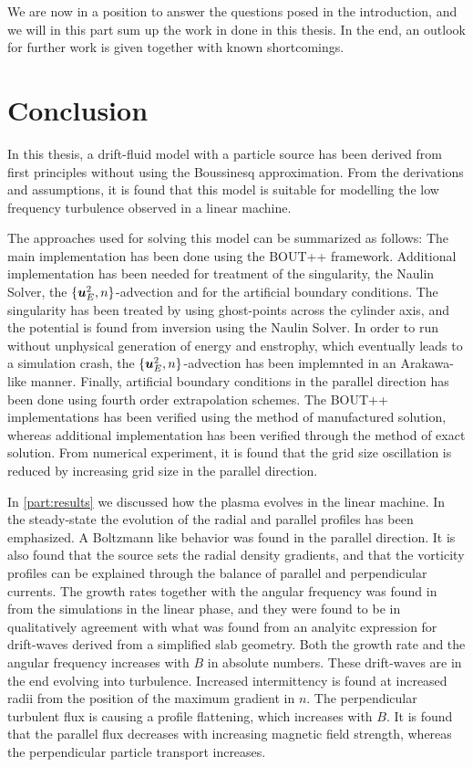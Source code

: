 %
We are now in a position to answer the questions posed in the introduction, and we will in this part sum up the work in done in this thesis.
In the end, an outlook for further work is given together with known shortcomings.

\section*{Conclusion}
%
In this thesis, a drift-fluid model with a particle source has been derived from first principles without using the Boussinesq approximation.
From the derivations and assumptions, it is found that this model is suitable for modelling the low frequency turbulence observed in a linear machine.

The approaches used for solving this model can be summarized as follows:
The main implementation has been done using the BOUT++ framework.
Additional implementation has been needed for treatment of the singularity, the Naulin Solver, the $\{\boldsymbol{u}_E^2,n\}$-advection and for the artificial boundary conditions.
The singularity has been treated by using ghost-points across the cylinder axis, and the potential is found from inversion using the Naulin Solver.
In order to run without unphysical generation of energy and enstrophy, which eventually leads to a simulation crash, the $\{\boldsymbol{u}_E^2,n\}$-advection has been implemnted in an Arakawa-like manner.
Finally, artificial boundary conditions in the parallel direction has been done using fourth order extrapolation schemes.
The BOUT++ implementations has been verified using the method of manufactured solution, whereas additional implementation has been verified through the method of exact solution.
From numerical experiment, it is found that the grid size oscillation is reduced by increasing grid size in the parallel direction.

In \cref{part:results} we discussed how the plasma evolves in the linear machine.
In the steady-state the evolution of the radial and parallel profiles has been emphasized.
A Boltzmann like behavior was found in the parallel direction.
It is also found that the source sets the radial density gradients, and that the vorticity profiles can be explained through the balance of parallel and perpendicular currents.
The growth rates together with the angular frequency was found in from the simulations in the linear phase, and they were found to be in qualitatively agreement with what was found from an analyitc expression for drift-waves derived from a simplified slab geometry.
Both the growth rate and the angular frequency increases with $B$ in absolute numbers.
These drift-waves are in the end evolving into turbulence.
Increased intermittency is found at increased radii from the position of the maximum gradient in $n$.
The perpendicular turbulent flux is causing a profile flattening, which increases with $B$.
It is found that the parallel flux decreases with increasing magnetic field strength, whereas the perpendicular particle transport increases.

